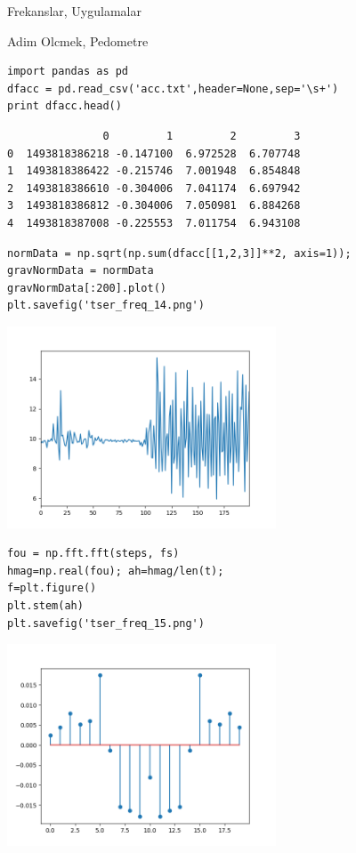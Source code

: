 \documentclass[12pt,fleqn]{article}\usepackage{../../common}
\begin{document}
Frekanslar, Uygulamalar

Adim Olcmek, Pedometre

\begin{verbatim}
import pandas as pd
dfacc = pd.read_csv('acc.txt',header=None,sep='\s+')
print dfacc.head()
\end{verbatim}

\begin{verbatim}
               0         1         2         3
0  1493818386218 -0.147100  6.972528  6.707748
1  1493818386422 -0.215746  7.001948  6.854848
2  1493818386610 -0.304006  7.041174  6.697942
3  1493818386812 -0.304006  7.050981  6.884268
4  1493818387008 -0.225553  7.011754  6.943108
\end{verbatim}

\begin{verbatim}
normData = np.sqrt(np.sum(dfacc[[1,2,3]]**2, axis=1));
gravNormData = normData 
gravNormData[:200].plot()
plt.savefig('tser_freq_14.png')
\end{verbatim}

\includegraphics[height=6cm]{tser_freq_14.png}

\begin{verbatim}
fou = np.fft.fft(steps, fs)
hmag=np.real(fou); ah=hmag/len(t);
f=plt.figure()
plt.stem(ah)
plt.savefig('tser_freq_15.png')
\end{verbatim}

\includegraphics[height=6cm]{tser_freq_15.png}
\end{document}

